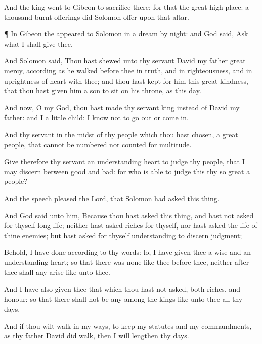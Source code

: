 {And the
king
went to
Gibeon to
sacrifice there; for
that
{} the
great high
place: a
thousand burnt
offerings did
Solomon
offer upon that
altar.


\par }{\PP {}¶ In
Gibeon the
{}
appeared to
Solomon in a
dream by
night: and
God
said,
Ask what I shall
give thee.

And
Solomon
said, Thou hast
shewed unto thy
servant
David my
father
great
mercy, according as he
walked
before thee in
truth, and in
righteousness, and in
uprightness of
heart with thee; and thou hast
kept for him this
great
kindness, that thou hast
given him a
son to
sit on his
throne, as
{} this
day.

And now, O
{} my
God, thou hast made thy
servant
king instead of
David my
father: and I
{} a
little
child: I
know not
{} to go
out or come
in.

And thy
servant
{} in the
midst of thy
people which thou hast
chosen, a
great
people, that cannot be
numbered nor
counted for
multitude.

Give therefore thy
servant an
understanding
heart to
judge thy
people, that I may
discern between
good and
bad: for who is
able to
judge this thy so
great a
people?

And the
speech
pleased the
Lord, that
Solomon had
asked this
thing.

And
God
said unto him, Because thou hast
asked this
thing, and hast not
asked for thyself
long
life; neither hast
asked
riches for thyself, nor hast
asked the
life of thine
enemies; but hast
asked for thyself
understanding to
discern
judgment;

Behold, I have
done according to thy
words: lo, I have
given thee a
wise and an
understanding
heart; so that there was none like thee
before thee, neither
after thee shall any
arise like unto thee.

And I have also
given thee that which thou hast not
asked, both
riches, and
honour: so that there shall not be
any among the
kings like unto thee all thy
days.

And if thou wilt
walk in my
ways, to
keep my
statutes and my
commandments, as thy
father
David did
walk, then I will
lengthen thy
days.

}
